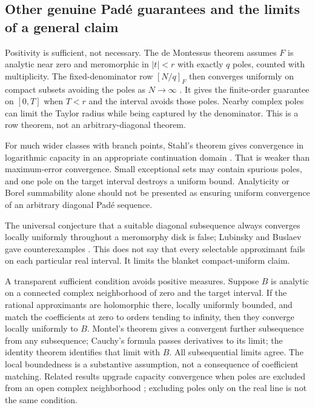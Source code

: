 \subsection{Other genuine Pad\'e guarantees and the limits of a general claim}
\label{app:pade-other}

Positivity is sufficient, not necessary. The de Montessus theorem
assumes $F$ is analytic near zero and meromorphic in $|t|<r$ with
exactly $q$ poles, counted with multiplicity. The fixed-denominator
row $[N/q]_F$ then converges uniformly on compact subsets avoiding
the poles as $N\to\infty$ \cite{Cacoq}. It gives the finite-order
guarantee on $[0,T]$ when $T<r$ and the interval avoids those poles.
Nearby complex poles can limit the Taylor radius while being captured
by the denominator. This is a row theorem, not an arbitrary-diagonal theorem.

For much wider classes with branch points, Stahl's theorem gives
convergence in logarithmic capacity in an appropriate continuation
domain \cite{Stahl}. That is weaker than maximum-error convergence.
Small exceptional sets may contain spurious poles, and one pole on
the target interval destroys a uniform bound. Analyticity or Borel
summability alone should not be presented as ensuring uniform
convergence of an arbitrary diagonal Pad\'e sequence.

The universal conjecture that a suitable diagonal subsequence always
converges locally uniformly throughout a meromorphy disk is false;
Lubinsky and Buslaev gave counterexamples \cite{Lubinsky,Buslaev}.
This does not say that every selectable approximant fails on each
particular real interval. It limits the blanket compact-uniform claim.

A transparent sufficient condition avoids positive measures. Suppose
$B$ is analytic on a connected complex neighborhood of zero and the
target interval. If the rational approximants are holomorphic there,
locally uniformly bounded, and match the coefficients at zero to
orders tending to infinity, then they converge locally uniformly to $B$.
Montel's theorem gives a convergent further subsequence from any
subsequence; Cauchy's formula passes derivatives to its limit; the
identity theorem identifies that limit with $B$. All subsequential
limits agree. The local boundedness is a substantive assumption,
not a consequence of coefficient matching. Related results upgrade
capacity convergence when poles are excluded from an open complex
neighborhood \cite{BeckermannMatos}; excluding poles only on the
real line is not the same condition.

